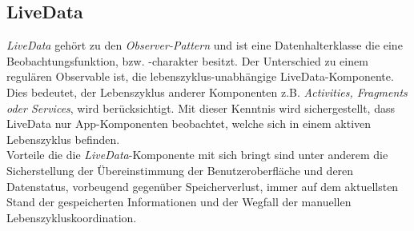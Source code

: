 \subsection*{LiveData}
\label{sec:LiveData}
\textit{LiveData} gehört zu den \textit{Observer-Pattern} und ist eine Datenhalterklasse die eine Beobachtungsfunktion, bzw. -charakter besitzt. Der 
Unterschied zu einem regulären Observable ist, die lebenszyklus-unabhängige LiveData-Komponente. Dies bedeutet, der Lebenszyklus anderer 
Komponenten z.B. \textit{Activities, Fragments oder Services}, wird berücksichtigt. Mit dieser Kenntnis wird sichergestellt, dass LiveData 
nur App-Komponenten beobachtet, welche sich in einem aktiven Lebenszyklus befinden. \cite{liveData}
\\ 
\linebreak
Vorteile die die \textit{LiveData}-Komponente mit sich bringt sind unter anderem die Sicherstellung der Übereinstimmung der Benutzeroberfläche und 
deren Datenstatus, vorbeugend gegenüber Speicherverlust, immer auf dem aktuellsten Stand der gespeicherten Informationen und der Wegfall 
der manuellen Lebenszykluskoordination. \cite{livedata.2020}
